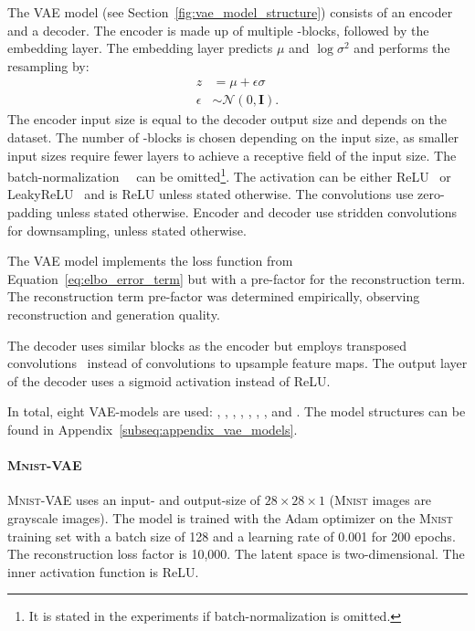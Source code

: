 The \ac{VAE} model (see Section~\ref{fig:vae_model_structure}) consists of an encoder and a decoder.
The encoder is made up of multiple -blocks, followed by the embedding layer.
The embedding layer predicts $\mu$ and $\log \sigma^2$ and performs the resampling by:
\begin{align}
    z &= \mu + \epsilon\sigma \\
    \epsilon &\sim \mathcal{N}(0, \bm{I}). \label{eq:resampling_vae}
\end{align}
The encoder input size is equal to the decoder output size and depends on the dataset.
The number of -blocks is chosen depending on the input size, as smaller input sizes require fewer layers to achieve a receptive field of the input size.
The batch-normalization~~\citep[pp. 317, ff.]{Goodfellow-et-al-2016} can be omitted\footnote{It is stated in the experiments if batch-normalization is omitted.}.
The activation can be either ReLU~\citep[p. 173]{Goodfellow-et-al-2016} or LeakyReLU~\citep[p. 192]{Goodfellow-et-al-2016} and is ReLU unless stated otherwise.
The convolutions use zero-padding unless stated otherwise.
Encoder and decoder use stridden convolutions for downsampling, unless stated otherwise.

The \ac{VAE} model implements the loss function from Equation~\ref{eq:elbo_error_term} but with a pre-factor for the reconstruction term.
The reconstruction term pre-factor was determined empirically, observing reconstruction and generation quality.

The decoder uses similar blocks as the encoder but employs transposed convolutions~\citep[pp. 356, ff.]{Goodfellow-et-al-2016} instead of convolutions to upsample feature maps.
The output layer of the decoder uses a sigmoid activation instead of ReLU.

In total, eight \ac{VAE}-models are used: , , , , ,  , , and .
The model structures can be found in Appendix~\ref{subseq:appendix_vae_models}.

\paragraph{\textsc{Mnist}-\ac{VAE}} \textsc{Mnist}-\ac{VAE} uses an input- and output-size of $28\times 28\times 1$ (\textsc{Mnist} images are grayscale images).
The model is trained with the Adam optimizer on the \textsc{Mnist} training set with a batch size of 128 and a learning rate of 0.001 for 200 epochs.
The reconstruction loss factor is 10,000.
The latent space is two-dimensional.
The inner activation function is ReLU.

